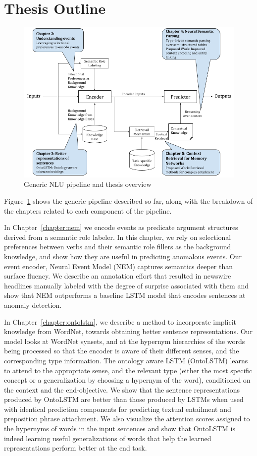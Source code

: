 \section{Thesis Outline}
\begin{figure}
\begin{center}
\includegraphics[width=6.5in]{figures/thesis_overview.png}
\caption{Generic NLU pipeline and thesis overview}
\label{fig:thesis_overview}
\end{center}
\end{figure}
Figure~\ref{fig:thesis_overview} shows the generic pipeline described so far, along with the breakdown of the chapters related to each component
of the pipeline.

In Chapter~\ref{chapter:nem} we encode events as predicate argument structures derived from a semantic role labeler.
In this chapter, we rely on selectional preferences between verbs and their semantic role fillers as the background
knowledge, and show how they are useful in predicting anomalous events.
Our event encoder, Neural Event Model (NEM) captures semantics deeper than surface fluency. We describe an annotation effort that
resulted in newswire headlines manually labeled with the degree of surprise associated with them and show that NEM outperforms
a baseline LSTM model that encodes sentences at anomaly detection. 

In Chapter~\ref{chapter:ontolstm}, we describe a method to incorporate implicit knowledge
from WordNet, towards obtaining better sentence representations. Our model looks at WordNet synsets,
and at the hypernym hierarchies of the words being processed so that the 
encoder is aware of their different senses, and the corresponding type information.
The ontology aware LSTM (OntoLSTM) learns to attend to the appropriate sense,
and the relevant type 
(either the most specific concept or a generalization by choosing a hypernym of
the word), conditioned on the context and the end-objective. We show that the sentence representations 
produced by OntoLSTM are better than those produced by LSTMs when used with identical prediction 
components for predicting textual entailment and preposition phrase attachment. We also visualize the attention scores assigned to the hypernyms 
of words in the input sentences and show that OntoLSTM is indeed learning useful generalizations of words
that help the learned representations perform better at the end task.

